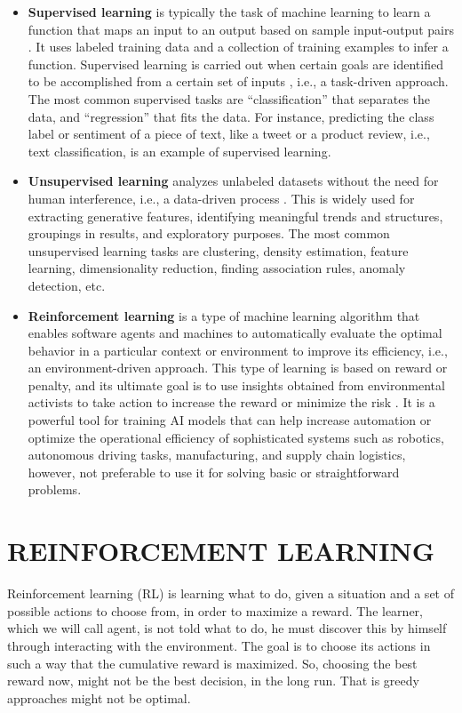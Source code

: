 \documentclass{article}
\begin{document}
\begin{itemize}
\renewcommand\labelitemi{--}
\item \textbf{Supervised learning} is typically the task of machine learning to learn a function that maps an input to an output based on sample input-output pairs \cite{han2022data}. It uses labeled training data and a collection of training examples to infer a function. Supervised learning is carried out when certain goals are identified to be accomplished from a certain set of inputs \cite{sarker2020cybersecurity}, i.e., a task-driven approach. The most common supervised tasks are “classification” that separates the data, and “regression” that fits the data. For instance, predicting the class label or sentiment of a piece of text, like a tweet or a product review, i.e., text classification, is an example of supervised learning.

\item \textbf{Unsupervised learning} analyzes unlabeled datasets without the need for human interference, i.e., a data-driven process \cite{han2022data}. This is widely used for extracting generative features, identifying meaningful trends and structures, groupings in results, and exploratory purposes. The most common unsupervised learning tasks are clustering, density estimation, feature learning, dimensionality reduction, finding association rules, anomaly detection, etc.

\item \textbf{Reinforcement learning} is a type of machine learning algorithm that enables software agents and machines to automatically evaluate the optimal behavior in a particular context or environment to improve its efficiency, i.e., an environment-driven approach\cite{kaelbling1996reinforcement}. This type of learning is based on reward or penalty, and its ultimate goal is to use insights obtained from environmental activists to take action to increase the reward or minimize the risk \cite{mohammed2016machine}. It is a powerful tool for training AI models that can help increase automation or optimize the operational efficiency of sophisticated systems such as robotics, autonomous driving tasks, manufacturing, and supply chain logistics, however, not preferable to use it for solving basic or straightforward problems.
\end{itemize}

\section{REINFORCEMENT LEARNING}
Reinforcement learning (RL) is learning what to do, given a situation and a set of possible actions to choose from, in order to maximize a reward. The learner, which we will call agent, is not told what to do, he must discover this by himself through interacting with the environment. The goal is to choose its actions in such a way that the cumulative reward is maximized. So, choosing the best reward now, might not be the best decision, in the long run. That is greedy approaches might not be optimal.
\end{document}
